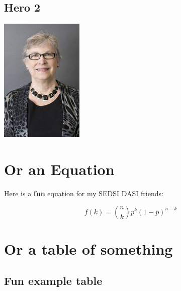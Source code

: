 \documentclass[
]{book}
\begin{document}
\hypertarget{hero-2}{%
\subsection{Hero 2}\label{hero-2}}

\begin{center}\includegraphics{_images/wilma} \end{center}

\hypertarget{or-an-equation}{%
\section{Or an Equation}\label{or-an-equation}}

Here is a \textbf{fun} equation for my SEDSI DASI friends:

\begin{equation} 
  f\left(k\right) = \binom{n}{k} p^k\left(1-p\right)^{n-k}
  \label{eq:binom}
\end{equation}

\hypertarget{or-a-table-of-something}{%
\section{Or a table of something}\label{or-a-table-of-something}}

\hypertarget{fun-example-table}{%
\subsection{Fun example table}\label{fun-example-table}}
\end{document}
